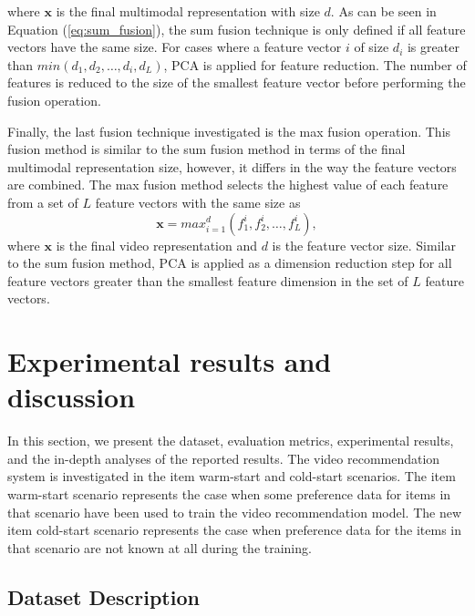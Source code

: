 \documentclass[review]{elsarticle}
\begin{document}
\noindent where $\mathbf{x}$ is the final multimodal representation with size $d$. As can be seen in Equation (\ref{eq:sum_fusion}), the sum fusion technique is only defined if all feature vectors have the same size. For cases where a feature vector $i$ of size $d_i$ is greater than $min(d_1, d_2, \dots, d_i, d_L)$, \ac{PCA} is applied for feature reduction. The number of features is reduced to the size of the smallest feature vector before performing the fusion operation. 

Finally, the last fusion technique investigated is the max fusion operation. This fusion method is similar to the sum fusion method in terms of the final multimodal representation size, however, it differs in the way the feature vectors are combined. The max fusion method selects the highest value of each feature from a set of $L$ feature vectors with the same size as 
\begin{equation}
    \mathbf{x} = max_{i=1}^{d}(f_1^{i}, f_2^{i}, \dots, f_L^{i}),
\end{equation}
where $\mathbf{x}$ is the final video representation and $d$ is the feature vector size. Similar to the sum fusion method, \ac{PCA} is applied as a dimension reduction step for all feature vectors greater than the smallest feature dimension in the set of $L$ feature vectors. 






\section{Experimental results and discussion}\label{sec:experiments}
In this section, we present the dataset, evaluation metrics, experimental results, and the in-depth analyses of the reported results. The video recommendation system is investigated in the item warm-start and cold-start scenarios. The item warm-start scenario represents the case when some preference data for items in that scenario have been used to train the video recommendation model. The new item cold-start scenario represents the case when preference data for the items in that scenario are not known at all during the training.  





\subsection{Dataset Description}\label{sec:dataset}
\end{document}
